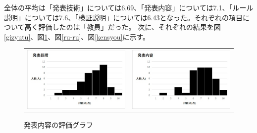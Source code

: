 全体の平均は「発表技術」については6.69、「発表内容」については7.1、「ルール説明」については7.6、「検証説明」については6.43となった。それぞれの項目について高く評価したのは「教員」だった。
次に、それぞれの結果を図\ref{gizyutu}、図\ref{naiyou}、図\ref{ru-ru}、図\ref{kensyou}に示す。

\begin{figure}[h]
 \begin{tabular}{cc}
  \begin{minipage}[h]{0.45\hsize}
  \centering
 \includegraphics[width=0.7\linewidth]{./figure/gizyutu.jpg}
\caption{発表技術の評価グラフ}
\label{gizyutu}
 \end{minipage} &

\begin{minipage}[h]{0.45\hsize}
  \centering
 \includegraphics[width=0.7\linewidth]{./figure/naiyou.jpg}
 \caption{発表内容の評価グラフ}
\label{naiyou}
\end{minipage} 
\end{tabular}
\end{figure}

